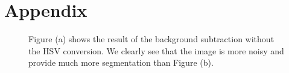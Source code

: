 \documentclass[runningheads]{llncs}
\begin{document}
%
%
%
%
%
% 
% 
%











\section*{Appendix}

\begin{figure}
\centering
{}
\hspace{0.01\linewidth}%
\caption{Figure (a) shows the result of the background subtraction without the HSV conversion. We clearly see that the image
is more noisy and provide much more segmentation than Figure (b).}
\label{object_detection}
\end{figure}
\end{document}
